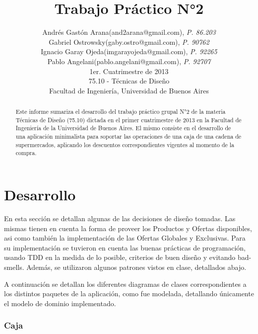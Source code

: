 \documentclass[a4paper,11pt]{article}
\title{\textbf{Trabajo Práctico N°2}}
\author{
  Andrés Gastón Arana(and2arana@gmail.com), \textit{P. 86.203}     \\
  Gabriel Ostrowsky(gaby.ostro@gmail.com), \textit{P. 90762}       \\
  Ignacio Garay Ojeda(imgarayojeda@gmail.com), \textit{P. 92265}   \\
  Pablo Angelani(pablo.angelani@gmail.com), \textit{P. 92707}      \\
  \normalsize{1er. Cuatrimestre de 2013}                           \\
  \normalsize{75.10 - Técnicas de Diseño}                          \\
  \normalsize{Facultad de Ingeniería, Universidad de Buenos Aires}
}
\date{}
\begin{document}
\thispagestyle{empty}
\maketitle

\begin{abstract}

  Este informe sumariza el desarrollo del trabajo práctico grupal N°2 de la
  materia Técnicas de Diseño (75.10) dictada en el primer cuatrimestre de 2013
  en la Facultad de Ingeniería de la Universidad de Buenos Aires. El mismo
  consiste en el desarrollo de una aplicación minimalista para soportar las
  operaciones de una caja de una cadena de supermercados, aplicando los
  descuentos correspondientes vigentes al momento de la compra.

\end{abstract}

\clearpage

\tableofcontents
\clearpage


\part{Desarrollo}

En esta sección se detallan algunas de las decisiones de diseño tomadas. Las
mismas tienen en cuenta la forma de proveer los Productos y Ofertas
disponibles, asi como también la implementación de las Ofertas Globales y
Exclusivas.  Para su implementación se tuvieron en cuenta las buenas prácticas
de programación, usando TDD en la medida de lo posible, criterios de buen
diseño y evitando bad-smells.  Además, se utilizaron algunos patrones vistos en
clase, detallados abajo.

A continuación se detallan los diferentes diagramas de clases correspondientes
a los distintos paquetes de la aplicación, como fue modelada, detallando
únicamente el modelo de dominio implementado.

\section{Caja}
\end{document}
